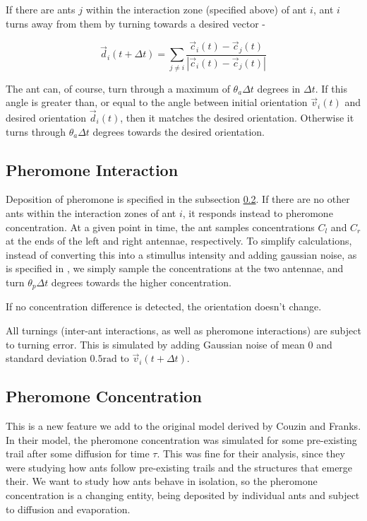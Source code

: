If there are ants $j$ within the interaction zone (specified above) of ant $i$, ant $i$ turns away from them by turning towards a desired vector - 

\begin{equation}
    \vec{d}_i(t + \Delta t) = \sum_{j \neq i} \frac{\vec{c}_i(t) - \vec{c}_j(t)}{|\vec{c}_i(t) - \vec{c}_j(t)|}
\end{equation}

The ant can, of course, turn through a maximum of $\theta_a\Delta t$ degrees in $\Delta t$. If this angle is greater than, or equal to the angle between initial orientation $\vec{v}_i(t)$ and desired orientation $\vec{d}_i(t)$, then it matches the desired orientation. Otherwise it turns through $\theta_a\Delta t$ degrees towards the desired orientation.

\subsection{Pheromone Interaction}

Deposition of pheromone is specified in the subsection \ref{subsec:pheromone}. If there are no other ants within the interaction zones of ant $i$, it responds instead to pheromone concentration. At a given point in time, the ant samples concentrations $C_l$ and $C_r$ at the ends of the left and right antennae,
respectively. To simplify calculations, instead of converting this into a stimullus intensity and adding gaussian noise, as is specified in \cite{Couzin2003}, we simply sample the concentrations at the two antennae, and turn $\theta_p \Delta t$ degrees towards the higher concentration.

If no concentration difference is detected, the orientation doesn't change.

All turnings (inter-ant interactions, as well as pheromone interactions) are subject to turning error. This is simulated by adding Gaussian noise of mean $0$ and standard deviation $0.5 \text{rad}$ to $\vec{v}_i(t + \Delta t)$.

\subsection{Pheromone Concentration}
\label{subsec:pheromone}

This is a new feature we add to the original model derived by Couzin and Franks. In their model, the pheromone concentration was simulated for some pre-existing trail after some diffusion for time $\tau$. This was fine for their analysis, since they were studying how ants follow pre-existing trails and the structures that emerge their. We want to study how ants behave in isolation, so the pheromone concentration is a changing entity, being deposited by individual ants and subject to diffusion and evaporation.


